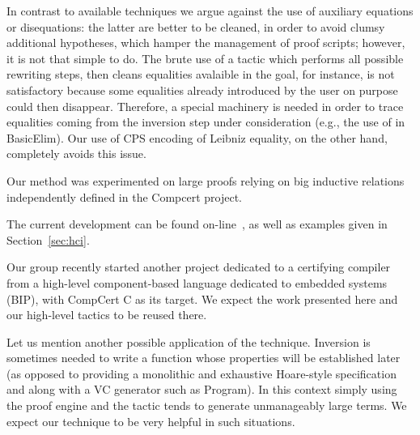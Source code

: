 In contrast to available techniques \cite{cornes95automating,mcbride00}
we argue against the use of auxiliary equations or disequations:
the latter are better to be cleaned, 
in order to avoid clumsy additional hypotheses, 
which hamper the management of proof scripts;
however, it is not that simple to do.
The brute use of a tactic which performs all possible rewriting
steps, then cleans equalities avalaible in the goal, for instance, 
is not satisfactory
because some equalities already introduced by the user on purpose
could then disappear. 
Therefore, a special machinery is needed in order
to trace equalities coming from the inversion step under consideration
(e.g., the use of  in BasicElim).
Our use of CPS encoding of Leibniz equality, on the other hand,
completely avoids this issue.

Our method was experimented on large proofs relying on 
big inductive relations independently defined in the Compcert project.

The current development can be found on-line~\cite{hci:examples},
as well as examples given in Section~\ref{sec:hci}.

Our group recently started another project dedicated
to a certifying compiler from a high-level component-based language dedicated
to embedded systems (BIP), with CompCert C as its target. 
We expect the work presented here and our high-level tactics
to be reused there.

Let us mention another possible application of the technique.
Inversion is sometimes
needed to write a function whose properties will be established later (as
opposed to providing a monolithic and exhaustive Hoare-style specification and
along with a VC generator such as Program). 
In this context simply using the proof engine and the \inversion tactic
tends to generate unmanageably large terms.
We expect our technique to be very helpful in such situations.



